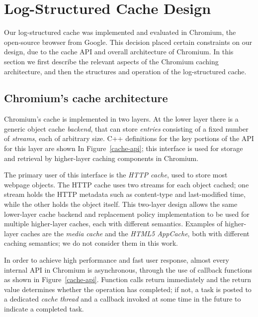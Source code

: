 \documentclass[letterpaper,twocolumn,10pt]{article}
\begin{document}
\section{Log-Structured Cache Design}

Our log-structured cache was implemented and evaluated in Chromium, the
open-source browser from Google.  This decision placed certain constraints on
our design, due to the cache API and overall architecture of Chromium.
In this section we first describe the relevant aspects of the Chromium
caching architecture, and then the structures and operation of the
log-structured cache.

\subsection{Chromium's cache architecture}

Chromium's cache is implemented in two layers.  At the lower layer there is a
generic object cache \emph{backend}, that can store \emph{entries} consisting of
a fixed number of \emph{streams}, each of arbitrary size.  C++ definitions for
the key portions of the API for this layer are shown In Figure~\ref{cache-api};
this interface is used for storage and retrieval by higher-layer caching
components in Chromium.

The primary user of this interface is the \emph{HTTP cache}, used to store most
webpage objects. The HTTP cache uses two streams for each object cached; one
stream holds the HTTP metadata such as content-type and last-modified time,
while the other holds the object itself.  This two-layer design allows the same
lower-layer cache backend and replacement policy implementation to be used for
multiple higher-layer caches, each with different semantics.  Examples of
higher-layer caches are the \emph{media cache} and the \emph{HTML5 AppCache},
both with different caching semantics; we do not consider them in this work.

In order to achieve high performance and fast user response, almost every
internal API in Chromium is asynchronous, through the use of callback functions
as shown in Figure~\ref{cache-api}.  Function calls return immediately and the
return value determines whether the operation has completed; if not, a task is
posted to a dedicated \emph{cache thread} and a callback invoked at some time in
the future to indicate a completed task.  
\end{document}
